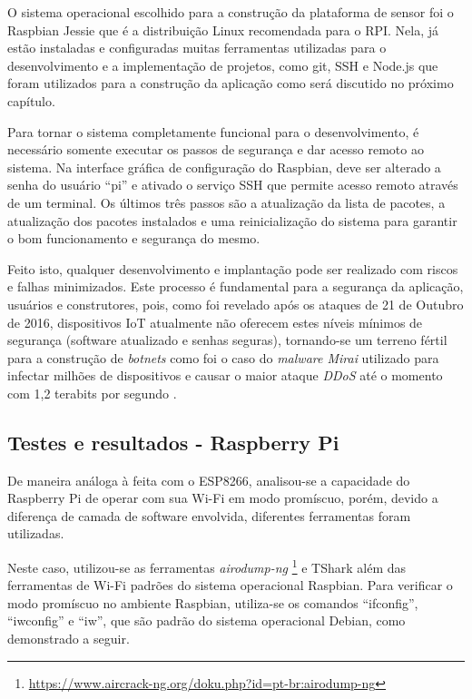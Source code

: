 O sistema operacional escolhido para a construção da plataforma de sensor foi o
Raspbian Jessie que é a distribuição Linux recomendada para o RPI. Nela, já estão
instaladas e configuradas muitas ferramentas utilizadas para o desenvolvimento e
a implementação de projetos, como git, SSH e Node.js que foram utilizados para a
construção da aplicação como será discutido no próximo capítulo.

Para tornar o sistema completamente funcional para o desenvolvimento, é
necessário somente executar os passos de segurança e dar acesso remoto
ao sistema. Na interface gráfica de configuração do Raspbian, deve ser alterado
a senha do usuário ``pi'' e ativado o serviço SSH que permite acesso remoto através
de um terminal. Os últimos três passos são a atualização da lista de pacotes,
a atualização dos pacotes instalados e uma reinicialização do sistema para
garantir o bom funcionamento e segurança do mesmo.

Feito isto, qualquer desenvolvimento e implantação pode ser realizado com riscos
e falhas minimizados. Este processo é fundamental para a segurança da aplicação,
usuários e construtores, pois, como foi revelado após os ataques de 21 de Outubro
de 2016, dispositivos IoT atualmente não oferecem estes níveis mínimos de
segurança (software atualizado e senhas seguras), tornando-se um terreno
fértil para a construção de \emph{botnets} como foi o caso do \emph{malware
Mirai} utilizado para infectar milhões de dispositivos e causar o maior ataque
\emph{DDoS} até o momento com 1,2 terabits por segundo
\cite{guardianMirai} \cite{nytimesMirai}.


\subsection{Testes e resultados - Raspberry Pi}
\label{subsec:testes-rpi}

De maneira análoga à feita com o ESP8266, analisou-se a capacidade do Raspberry Pi
de operar com sua Wi-Fi em modo promíscuo, porém, devido a diferença de camada
de software envolvida, diferentes ferramentas foram utilizadas.

Neste caso, utilizou-se as ferramentas \emph{airodump-ng}
\footnote{\url{https://www.aircrack-ng.org/doku.php?id=pt-br:airodump-ng}} e
TShark além das ferramentas de Wi-Fi padrões do sistema operacional Raspbian.
Para verificar o modo promíscuo no ambiente Raspbian, utiliza-se os comandos
``ifconfig'', ``iwconfig'' e ``iw'', que são padrão do sistema operacional
Debian, como demonstrado a seguir.

